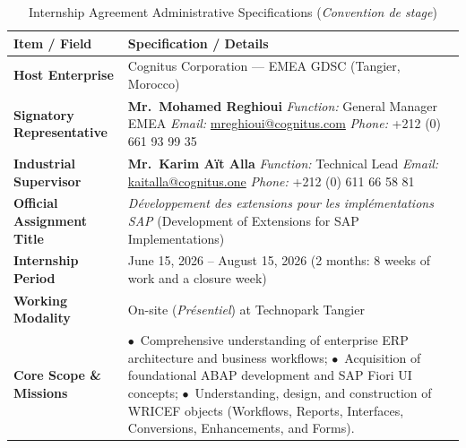 \begin{table}[H]
    \centering
    \begin{tabular}{|m{5cm}|m{9.5cm}|}
        \hline
        \textbf{Item / Field} & \textbf{Specification / Details} \\
        \hline
        \textbf{Host Enterprise} & Cognitus Corporation --- EMEA GDSC (Tangier, Morocco) \\
        \hline
        \textbf{Signatory Representative} & \textbf{Mr.\ Mohamed Reghioui} \newline \textit{Function:} General Manager EMEA \newline \textit{Email:} \href{mailto:mreghioui@cognitus.com}{mreghioui@cognitus.com} \newline \textit{Phone:} +212 (0) 661 93 99 35 \\
        \hline
        \textbf{Industrial Supervisor} & \textbf{Mr.\ Karim A\"it Alla} \newline \textit{Function:} Technical Lead \newline \textit{Email:} \href{mailto:kaitalla@cognitus.one}{kaitalla@cognitus.one} \newline \textit{Phone:} +212 (0) 611 66 58 81 \\
        \hline
        \textbf{Official Assignment Title} & \textit{D\'eveloppement des extensions pour les impl\'ementations SAP} (Development of Extensions for SAP Implementations) \\
        \hline
        \textbf{Internship Period} & June 15, 2026 -- August 15, 2026 (2 months: 8 weeks of work and a closure week) \\
        \hline
        \textbf{Working Modality} & On-site (\textit{Pr\'esentiel}) at Technopark Tangier \\
        \hline
        \textbf{Core Scope \& Missions} & 
        $\bullet$~Comprehensive understanding of enterprise ERP architecture and business workflows; \newline
        $\bullet$~Acquisition of foundational ABAP development and SAP Fiori UI concepts; \newline
        $\bullet$~Understanding, design, and construction of WRICEF objects (Workflows, Reports, Interfaces, Conversions, Enhancements, and Forms). \\
        \hline
    \end{tabular}
    \caption{Internship Agreement Administrative Specifications (\textit{Convention de stage})}
    \label{tab:convention_stage}
\end{table}

